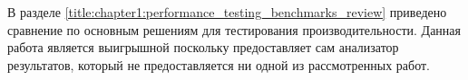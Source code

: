 В разделе \ref{title:chapter1:performance_testing_benchmarks_review} приведено сравнение по основным решениям для тестирования производительности. Данная работа является выигрышной поскольку предоставляет сам анализатор результатов, который не предоставляется ни одной из рассмотренных работ.